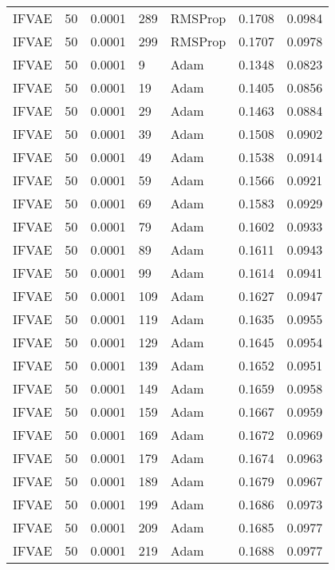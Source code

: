 \begin{tabular}{llrllrr}
 IFVAE &   50 &  0.0001 &   289 &   RMSProp &  0.1708 &       0.0984 \\
 IFVAE &   50 &  0.0001 &   299 &   RMSProp &  0.1707 &       0.0978 \\
 IFVAE &   50 &  0.0001 &     9 &      Adam &  0.1348 &       0.0823 \\
 IFVAE &   50 &  0.0001 &    19 &      Adam &  0.1405 &       0.0856 \\
 IFVAE &   50 &  0.0001 &    29 &      Adam &  0.1463 &       0.0884 \\
 IFVAE &   50 &  0.0001 &    39 &      Adam &  0.1508 &       0.0902 \\
 IFVAE &   50 &  0.0001 &    49 &      Adam &  0.1538 &       0.0914 \\
 IFVAE &   50 &  0.0001 &    59 &      Adam &  0.1566 &       0.0921 \\
 IFVAE &   50 &  0.0001 &    69 &      Adam &  0.1583 &       0.0929 \\
 IFVAE &   50 &  0.0001 &    79 &      Adam &  0.1602 &       0.0933 \\
 IFVAE &   50 &  0.0001 &    89 &      Adam &  0.1611 &       0.0943 \\
 IFVAE &   50 &  0.0001 &    99 &      Adam &  0.1614 &       0.0941 \\
 IFVAE &   50 &  0.0001 &   109 &      Adam &  0.1627 &       0.0947 \\
 IFVAE &   50 &  0.0001 &   119 &      Adam &  0.1635 &       0.0955 \\
 IFVAE &   50 &  0.0001 &   129 &      Adam &  0.1645 &       0.0954 \\
 IFVAE &   50 &  0.0001 &   139 &      Adam &  0.1652 &       0.0951 \\
 IFVAE &   50 &  0.0001 &   149 &      Adam &  0.1659 &       0.0958 \\
 IFVAE &   50 &  0.0001 &   159 &      Adam &  0.1667 &       0.0959 \\
 IFVAE &   50 &  0.0001 &   169 &      Adam &  0.1672 &       0.0969 \\
 IFVAE &   50 &  0.0001 &   179 &      Adam &  0.1674 &       0.0963 \\
 IFVAE &   50 &  0.0001 &   189 &      Adam &  0.1679 &       0.0967 \\
 IFVAE &   50 &  0.0001 &   199 &      Adam &  0.1686 &       0.0973 \\
 IFVAE &   50 &  0.0001 &   209 &      Adam &  0.1685 &       0.0977 \\
 IFVAE &   50 &  0.0001 &   219 &      Adam &  0.1688 &       0.0977 \\

\end{tabular}
